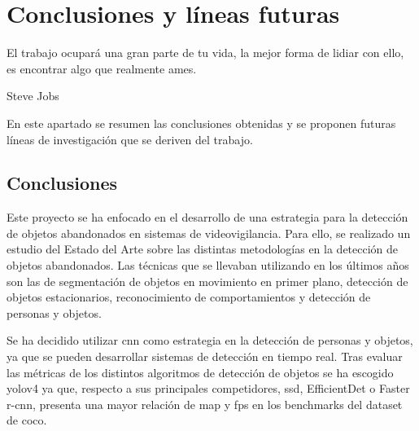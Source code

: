
\chapter{Conclusiones y líneas futuras}
\label{cha:concl-lineas-futuras}

\begin{FraseCelebre}
  \begin{Frase}
    El trabajo ocupará una gran parte de tu vida, la mejor forma de lidiar con ello, es encontrar algo que realmente ames.
  \end{Frase}
  \begin{Fuente}
    Steve Jobs
  \end{Fuente}
\end{FraseCelebre}

En este apartado se resumen las conclusiones obtenidas y se proponen futuras líneas de investigación
que se deriven del trabajo.

\section{Conclusiones}
\label{sec:conclusiones-finales}

Este proyecto se ha enfocado en el desarrollo de una estrategia para la detección de objetos abandonados en sistemas de videovigilancia. Para ello, se realizado un estudio del Estado del Arte sobre las distintas metodologías en la detección de objetos abandonados. Las técnicas que se llevaban utilizando en los últimos años son las de segmentación de objetos en movimiento en primer plano, detección de objetos estacionarios, reconocimiento de comportamientos y detección de personas y objetos.

Se ha decidido utilizar \gls{cnn} como estrategia en la detección de personas y objetos, ya que se pueden desarrollar sistemas de detección en tiempo real. Tras evaluar las métricas de los distintos algoritmos de detección de objetos se ha escogido \gls{yolov4} ya que, respecto a sus principales competidores, \gls{ssd}, EfficientDet o Faster \gls{r-cnn}, presenta una mayor relación de \gls{map} y \gls{fps} en los benchmarks del dataset de \gls{coco}.

